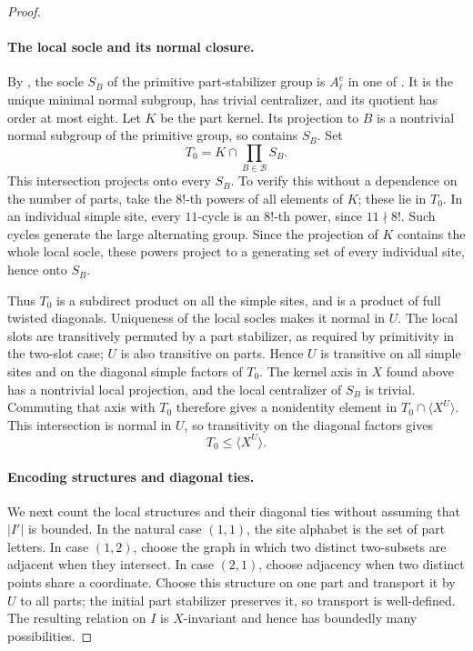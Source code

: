 \begin{proof}
\paragraph{The local socle and its normal closure.}
By , the socle $S_B$ of the primitive
part-stabilizer group is $A_\ell^e$ in one of
.  It is the unique minimal normal
subgroup, has trivial centralizer, and its quotient has order
at most eight.  Let $K$ be the part kernel.  Its projection to
$B$ is a nontrivial normal subgroup of the primitive group,
so contains $S_B$.  Set
\[
 T_0=K\cap\prod_{B\in\mathcal B}S_B.
\]
This intersection projects onto every $S_B$.  To verify this
without a dependence on the number of parts, take the
$8!$-th powers of all elements of $K$; these lie in $T_0$.
In an individual simple site, every $11$-cycle is an $8!$-th
power, since $11\nmid8!$.  Such cycles generate the large
alternating group.  Since the projection of $K$ contains the
whole local socle, these powers project to a generating set
of every individual site, hence onto $S_B$.

Thus $T_0$ is a subdirect product on all the simple sites,
and is a product of full twisted diagonals.  Uniqueness of
the local socles makes it normal in $U$.  The local slots are
transitively permuted by a part stabilizer, as required by
primitivity in the two-slot case; $U$ is also transitive on
parts.  Hence $U$ is transitive on all simple sites and on
the diagonal simple factors of $T_0$.  The kernel axis in
$X$ found above has a nontrivial local projection, and the
local centralizer of $S_B$ is trivial.  Commuting that axis
with $T_0$ therefore gives a nonidentity element in
$T_0\cap\langle X^U\rangle$.  This intersection is normal
in $U$, so transitivity on the diagonal factors gives
\begin{equation}\label{n:socle-normal-closure}
 T_0\le\langle X^U\rangle.
\end{equation}

\paragraph{Encoding structures and diagonal ties.}
We next count the local structures and their diagonal ties
without assuming that $|I'|$ is bounded.  In the natural
case $(1,1)$, the site alphabet is the set of part letters.
In case $(1,2)$, choose the graph in which two distinct
two-subsets are adjacent when they intersect.  In case
$(2,1)$, choose adjacency when two distinct points share a
coordinate.  Choose this structure on one part and
transport it by $U$ to all parts; the initial part
stabilizer preserves it, so transport is well-defined.
The resulting relation on $I$ is $X$-invariant and hence
has boundedly many possibilities.


\end{proof}
